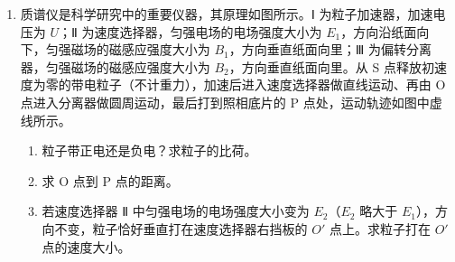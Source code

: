 \documentclass[\gkver]{gaokaozhenti}
\begin{document}
\begin{enumerate}
{$F - mg = \frac{mv_{0}^{2}}{l}$

解得 $v_{0} = 4 \Ums$，$F = 40 \UN$

（2）A 与 C 相碰时，水平方向动量守恒，由于碰后 A 竖直下落可知

$mv_{0} = 0 + mv_{C}$

故解得 $v_{C} = v_{0} = 4 \Ums$

（3）A、C 碰后，C 相对 B 滑行 $4 \Um$ 后与 B 共速，则对 CB 分析，过程中根据动量守恒可得

$mv_{0} = (M + m)v$

根据能量守恒得

$\mu mgL_{\text{相对}} = \frac{1}{2}mv_{0}^{2} - \frac{1}{2}(m + M)v^{2}$

联立解得 $\mu = 0.15$
}

\item
质谱仪是科学研究中的重要仪器，其原理如图所示。Ⅰ 为粒子加速器，加速电压为 $U$；Ⅱ 为速度选择器，匀强电场的电场强度大小为 $E_{1}$，方向沿纸面向下，匀强磁场的磁感应强度大小为 $B_{1}$，方向垂直纸面向里；Ⅲ 为偏转分离器，匀强磁场的磁感应强度大小为 $B_{2}$，方向垂直纸面向里。从 S 点释放初速度为零的带电粒子（不计重力），加速后进入速度选择器做直线运动、再由 O 点进入分离器做圆周运动，最后打到照相底片的 P 点处，运动轨迹如图中虚线所示。
\begin{enumerate}
	\item
	粒子带正电还是负电？求粒子的比荷。
	\item
	求 O 点到 P 点的距离。
	\item
	若速度选择器 Ⅱ 中匀强电场的电场强度大小变为 $E_{2}$（$E_{2}$ 略大于 $E_{1}$），方向不变，粒子恰好垂直打在速度选择器右挡板的 $O'$ 点上。求粒子打在 $O'$ 点的速度大小。
\end{enumerate}

\end{enumerate}
\end{document}
